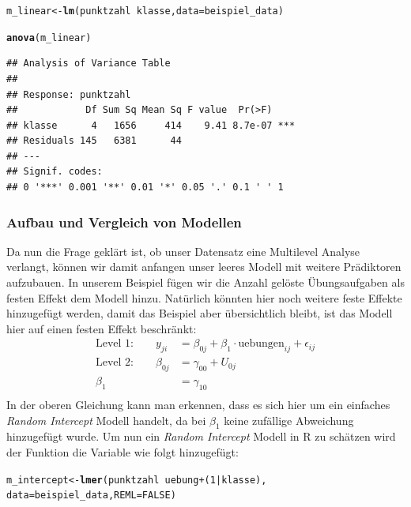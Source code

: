 \documentclass[12pt]{article}\usepackage[]{graphicx}\usepackage[]{color}
\makeatletter
\newcommand{\hlnum}[1]{\textcolor[rgb]{0.686,0.059,0.569}{#1}}%
\newcommand{\hlopt}[1]{\textcolor[rgb]{0,0,0}{#1}}%
\newcommand{\hlstd}[1]{\textcolor[rgb]{0.345,0.345,0.345}{#1}}%
\newcommand{\hlkwb}[1]{\textcolor[rgb]{0.69,0.353,0.396}{#1}}%
\newcommand{\hlkwc}[1]{\textcolor[rgb]{0.333,0.667,0.333}{#1}}%
\newcommand{\hlkwd}[1]{\textcolor[rgb]{0.737,0.353,0.396}{\textbf{#1}}}%
\newenvironment{kframe}{%
 \def\at@end@of@kframe{}%
 \ifinner\ifhmode%
  \def\at@end@of@kframe{\end{minipage}}%
  \begin{minipage}{\columnwidth}%
 \fi\fi%
 \def\FrameCommand##1{\hskip\@totalleftmargin \hskip-\fboxsep
 \colorbox{shadecolor}{##1}\hskip-\fboxsep
     \hskip-\linewidth \hskip-\@totalleftmargin \hskip\columnwidth}%
 \MakeFramed {\advance\hsize-\width
   \@totalleftmargin\z@ \linewidth\hsize
   \@setminipage}}%
 {\par\unskip\endMakeFramed%
 \at@end@of@kframe}
\newenvironment{knitrout}{}{} %
\makeatother
\begin{document}
\singlespacing
\begin{knitrout}
\color{fgcolor}\begin{kframe}
\begin{alltt}
\hlstd{m_linear} \hlkwb{<-} \hlkwd{lm}\hlstd{(punktzahl} \hlopt{~} \hlstd{klasse,} \hlkwc{data} \hlstd{= beispiel_data)}

\hlkwd{anova}\hlstd{(m_linear)}
\end{alltt}
\begin{verbatim}
## Analysis of Variance Table
## 
## Response: punktzahl
##            Df Sum Sq Mean Sq F value  Pr(>F)    
## klasse      4   1656     414    9.41 8.7e-07 ***
## Residuals 145   6381      44                    
## ---
## Signif. codes:  
## 0 '***' 0.001 '**' 0.01 '*' 0.05 '.' 0.1 ' ' 1
\end{verbatim}
\end{kframe}
\end{knitrout}

\subsubsection{Aufbau und Vergleich von Modellen}
Da nun die Frage geklärt ist, ob unser Datensatz eine Multilevel Analyse verlangt, können wir damit anfangen unser leeres Modell mit weitere Prädiktoren aufzubauen. In unserem Beispiel fügen wir die Anzahl gelöste Übungsaufgaben als festen Effekt dem Modell hinzu. Natürlich könnten hier noch weitere feste Effekte hinzugefügt werden, damit das Beispiel aber übersichtlich bleibt, ist das Modell hier auf einen festen Effekt beschränkt:
\begin{equation}
\begin{split}	
 \text{Level 1:}  \qquad y_{ji} & = \beta_{0j} + \beta_{1} \cdot \text{uebungen}_{ij} + \epsilon_{ij}\\
 \text{Level 2:} \qquad \beta_{0j} & = \gamma_{00} + U_{0j}\\
 \beta_{1} & = \gamma_{10}\\
\end{split}	
\end{equation} 
In der oberen Gleichung kann man erkennen, dass es sich hier um ein einfaches \textit{Random Intercept} Modell handelt, da bei $\beta_{1}$ keine zufällige Abweichung hinzugefügt wurde. Um nun ein \textit{Random Intercept} Modell in R zu schätzen wird der Funktion die Variable wie folgt hinzugefügt:

\singlespacing
\begin{knitrout}
\color{fgcolor}\begin{kframe}
\begin{alltt}
\hlstd{m_intercept} \hlkwb{<-} \hlkwd{lmer}\hlstd{(punktzahl} \hlopt{~} \hlstd{uebung} \hlopt{+} \hlstd{(}\hlnum{1} \hlopt{|} \hlstd{klasse),}
        \hlkwc{data} \hlstd{= beispiel_data,} \hlkwc{REML} \hlstd{=} \hlnum{FALSE}\hlstd{)}
\end{alltt}
\end{kframe}
\end{knitrout}
\end{document}
